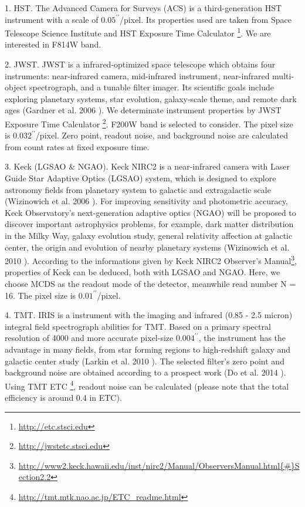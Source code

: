 \documentclass[a4paper,11pt]{article}
\begin{document}
    1. HST. The Advanced Camera for Surveys (ACS) is a third-generation HST instrument with a scale of $0.05^{\prime\prime}$/pixel. Its properties used are taken from Space Telescope Science Institute and HST Exposure Time Calculator \footnote{\url{http://etc.stsci.edu}}. We are interested in F814W band.
    
    2. JWST. JWST is a infrared-optimized space telescope which obtains four instruments: near-infrared camera, mid-infrared instrument, near-infrared multi-object spectrograph, and a tunable filter imager. Its scientific goals include exploring planetary systems, star evolution, galaxy-scale theme, and remote dark ages (Gardner et al. 2006 \cite{2006SSRv..123..485G}). We determinate instrument properties by JWST Exposure Time Calculator \footnote{\url{http://jwstetc.stsci.edu}}. F200W band is selected to consider. The pixel size is $0.032^{\prime\prime}$/pixel. Zero point, readout noise, and background noise are calculated from count rates at fixed exposure time.
    
	    3. Keck (LGSAO \& NGAO). Keck NIRC2 is a near-infrared camera with Laser Guide Star Adaptive Optics (LGSAO) system, which is designed to explore astronomy fields from planetary system to galactic and extragalactic scale (Wizinowich et al. 2006 \cite{2006PASP..118..297W}).
	     For improving sensitivity and photometric accuracy, Keck Observatory's next-generation adaptive optics (NGAO) will be proposed to discover important astrophysics problems, for example, dark matter distribution in the Milky Way, galaxy evolution study, general relativity affection at galactic center, the origin and evolution of nearby planetary systems (Wizinowich et al. 2010 \cite{2010SPIE.7736E..0KW}).
	    According to the informations given by Keck NIRC2 Observer's Manual\footnote{\url{http://www2.keck.hawaii.edu/inst/nirc2/Manual/ObserversManual.html{\#}Section2.2}}, properties of Keck can be deduced, both with LGSAO and NGAO. Here, we choose MCDS as the readout mode of the detector, meanwhile read number N = 16. The pixel size is $0.01^{\prime\prime}$/pixel.
    
    4. TMT. IRIS is a instrument with the imaging and infrared (0.85 - 2.5 micron) integral field spectrograph abilities for TMT. Based on a primary spectral resolution of 4000 and more accurate pixel-size $0.004^{\prime\prime}$, the instrument has the advantage in many fields, from star forming regions to high-redshift galaxy and galactic center study (Larkin et al. 2010 \cite{2010SPIE.7735E..29L}). The selected filter's zero point and background noise are obtained according to a prospect work (Do et al. 2014 \cite{2014AJ....147...93D}). Using TMT ETC \footnote{\url{http://tmt.mtk.nao.ac.jp/ETC_readme.html}}, readout noise can be calculated (please note that the total efficiency is around 0.4 in ETC). 
    
\end{document}
